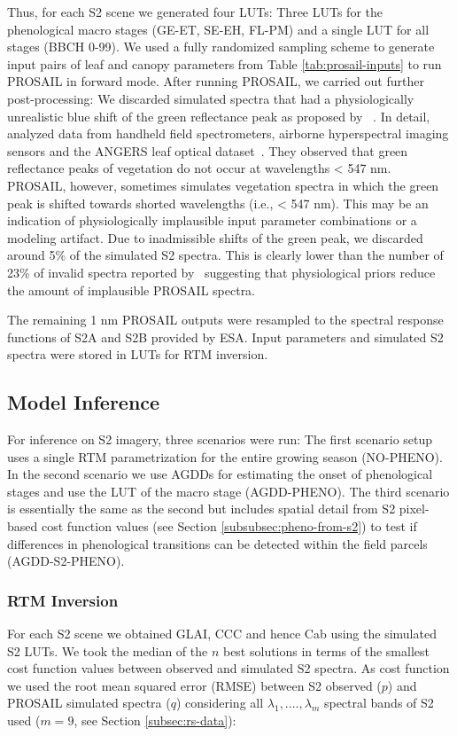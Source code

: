 Thus, for each \gls{S2} scene we generated four \gls{LUT}s: Three \gls{LUT}s for the phenological macro stages (GE-ET, SE-EH, FL-PM) and a single \gls{LUT} for all stages (BBCH 0-99). We used a fully randomized sampling scheme to generate input pairs of leaf and canopy parameters from Table \ref{tab:prosail-inputs} to run PROSAIL in forward mode. After running PROSAIL, we carried out further post-processing: We discarded simulated spectra that had a physiologically unrealistic blue shift of the green reflectance peak as proposed by ~\cite{wocher_rtm-based_2020}. In detail,~\cite{wocher_rtm-based_2020} analyzed data from handheld field spectrometers, airborne hyperspectral imaging sensors and the ANGERS leaf optical dataset~\citep{jacquemoud_angers_2003}. They observed that green reflectance peaks of vegetation do not occur at wavelengths < 547 nm. PROSAIL, however, sometimes simulates vegetation spectra in which the green peak is shifted towards shorted wavelengths (i.e., < 547 nm). This may be an indication of physiologically implausible input parameter combinations or a modeling artifact. Due to inadmissible shifts of the green peak, we discarded around 5\% of the simulated \gls{S2} spectra. This is clearly lower than the number of 23\% of invalid spectra reported by~\cite{wocher_rtm-based_2020} suggesting that physiological priors reduce the amount of implausible PROSAIL spectra.

The remaining 1 nm PROSAIL outputs were resampled to the spectral response functions of S2A and S2B provided by ESA. Input parameters and simulated \gls{S2} spectra were stored in \gls{LUT}s for \gls{RTM} inversion. 

\subsection{Model Inference}
\label{subsec:model-inference}

For inference on \gls{S2} imagery, three scenarios were run: The first scenario setup uses a single \gls{RTM} parametrization for the entire growing season (NO-PHENO). In the second scenario we use AGDDs for estimating the onset of phenological stages and use the \gls{LUT} of the macro stage (AGDD-PHENO). The third scenario is essentially the same as the second but includes spatial detail from \gls{S2} pixel-based cost function values (see Section \ref{subsubsec:pheno-from-s2}) to test if differences in phenological transitions can be detected within the field parcels (AGDD-S2-PHENO).

\subsubsection{RTM Inversion}
For each \gls{S2} scene we obtained GLAI, \gls{CCC} and hence \gls{Cab} using the simulated \gls{S2} LUTs. We took the median of the $n$ best solutions in terms of the smallest cost function values between observed and simulated \gls{S2} spectra. As cost function we used the root mean squared error (RMSE) between \gls{S2} observed ($p$) and PROSAIL simulated spectra ($q$) considering all $\lambda_1, ...., \lambda_m$ spectral bands of \gls{S2} used ($m=9$, see Section \ref{subsec:rs-data}):

